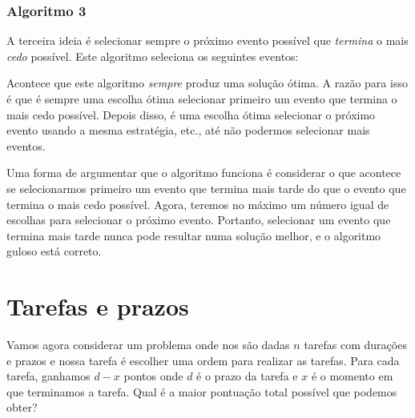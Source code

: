 \subsubsection*{Algoritmo 3}

A terceira ideia é selecionar sempre o próximo
evento possível que \emph{termina} o mais \emph{cedo} possível.
Este algoritmo seleciona os seguintes eventos:
\begin{center}
\end{center}

Acontece que este algoritmo
\emph{sempre} produz uma solução ótima.
A razão para isso é que é sempre uma escolha ótima
selecionar primeiro um evento que termina
o mais cedo possível.
Depois disso, é uma escolha ótima
selecionar o próximo evento
usando a mesma estratégia, etc.,
até não podermos selecionar mais eventos.

Uma forma de argumentar que o algoritmo funciona
é considerar
o que acontece se selecionarmos primeiro um evento
que termina mais tarde do que o evento que termina
o mais cedo possível.
Agora, teremos no máximo um número igual de
escolhas para selecionar o próximo evento.
Portanto, selecionar um evento que termina mais tarde
nunca pode resultar numa solução melhor,
e o algoritmo guloso está correto.

\section{Tarefas e prazos}

Vamos agora considerar um problema onde
nos são dadas $n$ tarefas com durações e prazos
e nossa tarefa é escolher uma ordem para realizar as tarefas.
Para cada tarefa, ganhamos $d-x$ pontos
onde $d$ é o prazo da tarefa
e $x$ é o momento em que terminamos a tarefa.
Qual é a maior pontuação total possível
que podemos obter?

